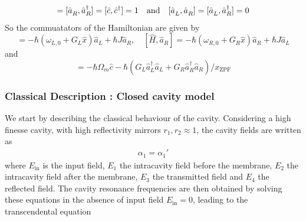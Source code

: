 \begin{equation*}
  [\hat a_L^{\vphantom{\dagger}}, \hat a_L^\dagger] = [\hat a_R^{\vphantom{\dagger}}  , \hat a_R^\dagger] = [\hat c, \hat c^\dagger] = 1 \quad \text{and} \quad [\hat a_L^{\vphantom{\dagger}}, \hat a_R^{\vphantom{\dagger}}] = [\hat a_L^{\vphantom{\dagger}},\hat a_R^{\dagger}]  = 0
\end{equation*}
So the commuatators of the Hamiltonian are given by
\begin{equation*}
  [\hat{H}, \hat a_L] = - \hbar (\omega_{L,0} + G_L \hat x) \hat a_L + \hbar J \hat a_R, \quad [\hat{H}, \hat a_R] = - \hbar (\omega_{R,0} + G_R \hat x) \hat a_R + \hbar J \hat a_L
\end{equation*}
and
\begin{equation*}
  [\hat{H}, \hat c] = - \hbar \Omega_m \hat c - \hbar (G_L \hat a_L^\dagger \hat a_L + G_R \hat a_R^\dagger \hat a_R)/x_{\mathrm{ZPF}}
\end{equation*}


\subsubsection{Classical Description : Closed cavity model}
We start by describing the classical behaviour of the cavity. Considering a high finesse cavity, with high reflectivity mirrors \(r_1, r_2 \approx 1\), the cavity fields are written as 
\begin{equation}
\begin{aligned}
\alpha_1 = \alpha_1'
\end{aligned}
\end{equation}
where \(E_{\mathrm{in}}\) is the input field, \(E_1\) the intracavity field before the membrane, \(E_2\) the intracavity field after the membrane, \(E_3\) the transmitted field and \(E_4\) the reflected field. The cavity resonance frequencies are then obtained by solving these equations in the absence of input field \(E_{\mathrm{in}}=0\), leading to the transcendental equation \cite{jayich_dispersive_2008}



